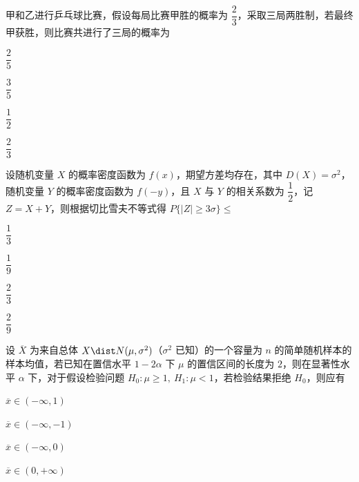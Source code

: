 \begin{question}[index=8]
甲和乙进行乒乓球比赛，假设每局比赛甲胜的概率为 $\dfrac23$，采取三局两胜制，若最终甲获胜，则比赛共进行了三局的概率为
\begin{choices}[columns=4]
\item $\dfrac25$
\item $\dfrac35$
\item $\dfrac12$
\item $\dfrac23$
\end{choices}
\end{question}
\QuestionBreak

\begin{question}[index=9]
设随机变量 $X$ 的概率密度函数为 $f(x)$，期望方差均存在，其中 $D(X)=\sigma^2$，随机变量 $Y$ 的\allowbreak\mbox{概率密度函数}为 $f(-y)$，且 $X$ 与 $Y$ 的相关系数为 $\dfrac12$，记 $Z=X+Y$，则根据\allowbreak\mbox{切比雪夫不等式}得 $P\{|Z|\geq 3\sigma\}\leq$
\begin{choices}[columns=4]
\item $\dfrac13$
\item $\dfrac19$
\item $\dfrac23$
\item $\dfrac29$
\end{choices}
\end{question}
\QuestionBreak

\begin{question}[index=10]
设 $\overline X$ 为来自总体 $X\dist N(\mu,\sigma^2)$（$\sigma^2$ 已知）的一个容量为 $n$ 的简单随机样本的样本均值，\allowbreak\mbox{若已知}在置信水平 $1-2\alpha$ 下 $\mu$ 的置信区间的长度为 $2$，则在显著性水平 $\alpha$ 下，对于\allowbreak\mbox{假设检验问题} $H_0:\mu\geq 1,\ H_1:\mu<1$，若检验结果拒绝 $H_0$，则应有
\begin{choices}[columns=4]
\item $\overline x\in(-\infty,1)$
\item $\overline x\in(-\infty,-1)$
\item $\overline x\in(-\infty,0)$
\item $\overline x\in(0,+\infty)$
\end{choices}
\end{question}
